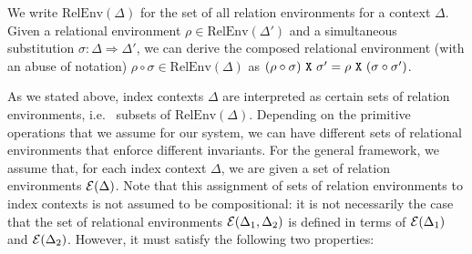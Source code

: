 
We write $\mathrm{RelEnv}(\Delta)$ for the set of all relation
environments for a context $\Delta$. Given a relational environment
$\rho \in \mathrm{RelEnv}(\Delta')$ and a simultaneous substitution
$\sigma : \Delta \Rightarrow \Delta'$, we can derive the composed
relational environment (with an abuse of notation) $\rho \circ \sigma
\in \mathrm{RelEnv}(\Delta)$ as $(\rho \circ \sigma)\ \texttt{X}\
\sigma' = \rho\ \texttt{X}\ (\sigma \circ \sigma')$.


As we stated above, index contexts $\Delta$ are interpreted as certain
sets of relation environments, i.e.~ subsets of
$\mathrm{RelEnv}(\Delta)$. Depending on the primitive operations that
we assume for our system, we can have different sets of relational
environments that enforce different invariants. For the general
framework, we assume that, for each index context $\Delta$, we are
given a set of relation environments $\mathcal{E}(\Delta)$. Note that
this assignment of sets of relation environments to index contexts is
not assumed to be compositional: it is not necessarily the case that
the set of relational environments $\mathcal{E}(\Delta_1,\Delta_2)$ is
defined in terms of $\mathcal{E}(\Delta_1)$ and
$\mathcal{E}(\Delta_2)$. However, it must satisfy the following two
properties:
